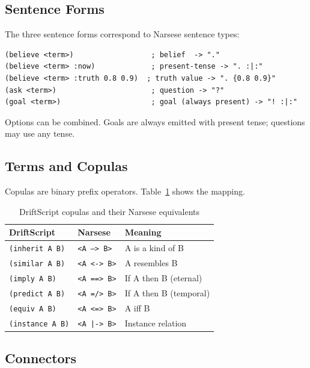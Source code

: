 \documentclass[11pt,a4paper]{article}
\begin{document}
\subsection{Sentence Forms}

The three sentence forms correspond to Narsese sentence types:

\begin{lstlisting}[language=DriftScript]
(believe <term>)                  ; belief  -> "."
(believe <term> :now)             ; present-tense -> ". :|:"
(believe <term> :truth 0.8 0.9)  ; truth value -> ". {0.8 0.9}"
(ask <term>)                      ; question -> "?"
(goal <term>)                     ; goal (always present) -> "! :|:"
\end{lstlisting}

Options can be combined. Goals are always emitted with present tense;
questions may use any tense.

\subsection{Terms and Copulas}

Copulas are binary prefix operators. Table~\ref{tab:ds_copulas} shows the
mapping.

\begin{table}[h]
\centering
\caption{DriftScript copulas and their Narsese equivalents}
\label{tab:ds_copulas}
\begin{tabular}{lll}
\toprule
\textbf{DriftScript} & \textbf{Narsese} & \textbf{Meaning} \\
\midrule
\texttt{(inherit A B)} & \texttt{<A --> B>} & A is a kind of B \\
\texttt{(similar A B)} & \texttt{<A <-> B>} & A resembles B \\
\texttt{(imply A B)} & \texttt{<A ==> B>} & If A then B (eternal) \\
\texttt{(predict A B)} & \texttt{<A =/> B>} & If A then B (temporal) \\
\texttt{(equiv A B)} & \texttt{<A <=> B>} & A iff B \\
\texttt{(instance A B)} & \texttt{<A |-> B>} & Instance relation \\
\bottomrule
\end{tabular}
\end{table}

\subsection{Connectors}
\end{document}

